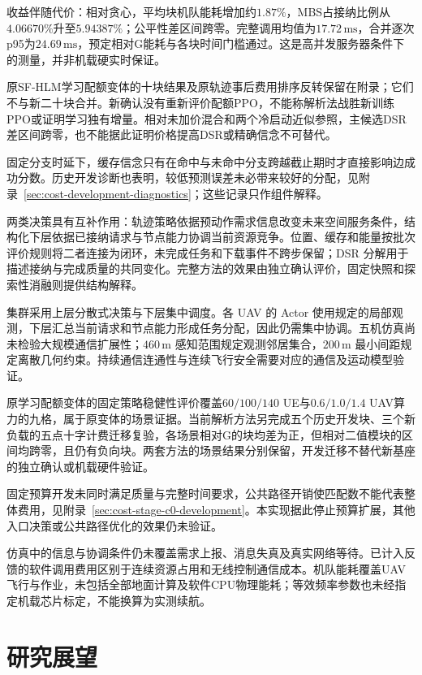 收益伴随代价：相对贪心，平均块机队能耗增加约$1.87\%$，MBS占接纳比例从$4.06670\%$升至$5.94387\%$；公平性差区间跨零。完整调用均值为$17.72\,\mathrm{ms}$，合并逐次p95为$24.69\,\mathrm{ms}$，预定相对G能耗与各块时间门槛通过。这是高并发服务器条件下的测量，并非机载硬实时保证。

原SF-HLM学习配额变体的十块结果及原轨迹事后费用排序反转保留在附录；它们不与新二十块合并。新确认没有重新评价配额PPO，不能称解析法战胜新训练PPO或证明学习独有增量。相对未加价混合和两个冷启动近似参照，主候选DSR差区间跨零，也不能据此证明价格提高DSR或精确信念不可替代。

固定分支时延下，缓存信念只有在命中与未命中分支跨越截止期时才直接影响边成功分数。历史开发诊断也表明，较低预测误差未必带来较好的分配，见附录~\ref{sec:cost-development-diagnostics}；这些记录只作组件解释。

两类决策具有互补作用：轨迹策略依据预动作需求信息改变未来空间服务条件，结构化下层依据已接纳请求与节点能力协调当前资源竞争。位置、缓存和能量按批次评价规则将二者连接为闭环，未完成任务和下载事件不跨步保留；DSR 分解用于描述接纳与完成质量的共同变化。完整方法的效果由独立确认评价，固定快照和探索性消融则提供结构解释。

集群采用上层分散式决策与下层集中调度。各 UAV 的 Actor 使用规定的局部观测，下层汇总当前请求和节点能力形成任务分配，因此仍需集中协调。五机仿真尚未检验大规模通信扩展性；$460\,\mathrm{m}$ 感知范围规定观测邻居集合，$200\,\mathrm{m}$ 最小间距规定离散几何约束。持续通信连通性与连续飞行安全需要对应的通信及运动模型验证。

原学习配额变体的固定策略稳健性评价覆盖$60/100/140$ UE与$0.6/1.0/1.4$ UAV算力的九格，属于原变体的场景证据。当前解析方法另完成五个历史开发块、三个新负载的五点十字计费迁移复验，各场景相对G的块均差为正，但相对二值模块的区间均跨零，且仍有负向块。两套方法的场景结果分别保留，开发迁移不替代新基座的独立确认或机载硬件验证。

固定预算开发未同时满足质量与完整时间要求，公共路径开销使匹配数不能代表整体费用，见附录~\ref{sec:cost-stage-c0-development}。本实现据此停止预算扩展，其他入口决策或公共路径优化的效果仍未验证。

仿真中的信息与协调条件仍未覆盖需求上报、消息失真及真实网络等待。已计入反馈的软件调用费用区别于连续资源占用和无线控制通信成本。机队能耗覆盖UAV飞行与作业，未包括全部地面计算及软件CPU物理能耗；等效频率参数也未经指定机载芯片标定，不能换算为实测续航。

\section{研究展望}
\label{sec:ch6-future}

